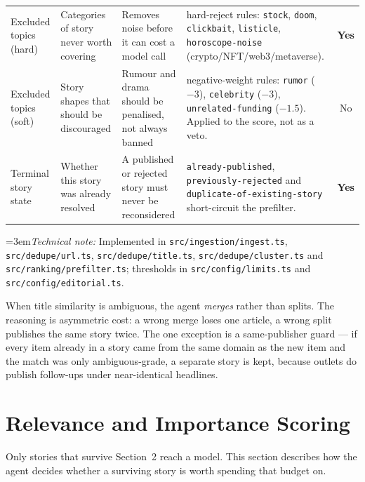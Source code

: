 \documentclass[11pt,a4paper]{article}
\newcommand{\file}[1]{\textcolor{aitkGray}{\texttt{\footnotesize\hyphenpenalty=0\exhyphenpenalty=0\relax #1}}}
\newcommand{\brk}{\hyphenpenalty=0\exhyphenpenalty=0\relax}
\newcommand{\code}[1]{\texttt{\small\brk #1}}
\newcommand{\Yes}{\textcolor{aitkStop}{\textbf{Yes}}}
\newcommand{\No}{\textcolor{aitkGray}{No}}
\newcommand{\technote}[1]{\par\vspace{-0.25em}\begingroup\footnotesize\color{aitkGray}\sloppy\emergencystretch=3em\textit{Technical note:} #1\par\endgroup}
\begin{document}
\begin{center}
\begin{longtable}{@{}>{\RaggedRight}p{2.6cm}>{\RaggedRight}p{2.9cm}>{\RaggedRight}p{3.0cm}>{\RaggedRight}p{4.4cm}c@{}}
Excluded topics (hard) &
Categories of story never worth covering &
Removes noise before it can cost a model call &
5 hard-reject rules: \code{stock}, \code{doom}, \code{clickbait},
\code{listicle}, \code{horoscope-noise} (crypto/NFT/web3/metaverse). &
\Yes \\

Excluded topics (soft) &
Story shapes that should be discouraged &
Rumour and drama should be penalised, not always banned &
3 negative-weight rules: \code{rumor} ($-3$), \code{celebrity} ($-3$),
\code{unrelated-funding} ($-1.5$). Applied to the score, not as a veto. &
\No \\

Terminal story state &
Whether this story was already resolved &
A published or rejected story must never be reconsidered &
\code{already-published}, \code{previously-rejected} and
\code{duplicate-of-}\allowbreak\code{existing-story} short-circuit the prefilter. &
\Yes \\
\bottomrule
\end{longtable}
\end{center}

\technote{Implemented in \file{src/ingestion/ingest.ts}, \file{src/dedupe/url.ts},
\file{src/dedupe/title.ts}, \file{src/dedupe/cluster.ts} and
\file{src/ranking/prefilter.ts}; thresholds in \file{src/config/limits.ts} and
\file{src/config/editorial.ts}.}

\begin{blockbox}
When title similarity is ambiguous, the agent \emph{merges} rather than splits.
The reasoning is asymmetric cost: a wrong merge loses one article, a wrong split
publishes the same story twice. The one exception is a same-publisher guard ---
if every item already in a story came from the same domain as the new item and
the match was only ambiguous-grade, a separate story is kept, because outlets do
publish follow-ups under near-identical headlines.
\end{blockbox}

\section{Relevance and Importance Scoring}

Only stories that survive Section~2 reach a model. This section describes how the
agent decides whether a surviving story is worth spending that budget on.
\end{document}
